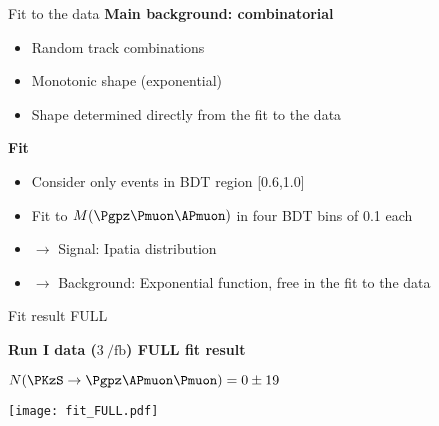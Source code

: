 \documentclass[9pt,hyperref={unicode},utf8]{beamer}
\newcommand{\KsPizMuMu}{\ensuremath{\PKzS\rightarrow \Pgpz\APmuon\Pmuon} }
\begin{document}
\begin{frame}{Fit to the data}
    \textbf{Main background: combinatorial}
    \begin{itemize}
      \item Random track combinations 
      \item Monotonic shape (exponential)
      \item Shape determined directly from the fit to the data
    \end{itemize}
    
    \vspace{0.5cm}
 
    \textbf{Fit}
    \begin{itemize}
    \setlength\itemsep{0.6em}
    \item Consider only events in BDT region [0.6,1.0]
    \item Fit to $M(\Pgpz\Pmuon\APmuon)$ in four BDT bins of 0.1 each
    \item[] $\rightarrow$ Signal: Ipatia distribution
    \item[] $\rightarrow$ Background: Exponential function, free in the fit to the data
    \end{itemize}  
\end{frame}

\begin{frame}{Fit result FULL}
  \begin{center}
     \textbf{Run I data ($\SI{3}{\per\femto\barn}$) FULL fit result}\\ 
     
    \vspace{0.2cm}
    
    \textbf{$N(\KsPizMuMu)= 0\pm 19$}\\%
    
    \vspace{0.2cm}
    
      \texttt{[image: fit\_FULL.pdf]}\\
    
  \end{center}
\end{frame}
\end{document}
